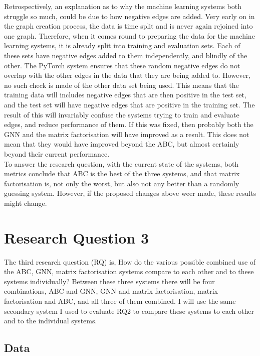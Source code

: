 \documentclass{l4proj}
\begin{document}
Retrospectively, an explanation as to why the machine learning systems both struggle so much, could be due to how negative edges are added. Very early on in the graph creation process, the data is time split and is never again rejoined into one graph. Therefore, when it comes round to preparing the data for the machine learning systems, it is already split into training and evaluation sets. Each of these sets have negative edges added to them independently, and blindly of the other. The PyTorch system ensures that these random negative edges do not overlap with the other edges in the data that they are being added to. However, no such check is made of the other data set being used. This means that the training data will includes negative edges that are then positive in the test set, and the test set will have negative edges that are positive in the training set. The result of this will invariably confuse the systems trying to train and evaluate edges, and reduce performance of them. If this was fixed, then probably both the GNN and the matrix factorisation will have improved as a result. This does not mean that they would have improved beyond the ABC, but almost certainly beyond their current performance. \\

To answer the research  question, with the current state of the systems, both metrics conclude that ABC is the best of the three systems, and that matrix factorisation is, not only the worst, but also not any better than a randomly guessing system. However, if the proposed changes above weer made, these results might change.\\

\section{Research Question 3}

The third research question (RQ) is, How do the various possible combined use of the ABC, GNN, matrix factorisation systems compare to each other and to these systems individually? Between these three systems there will be four combinations, ABC and GNN, GNN and matrix factorisation, matrix factorisation and ABC, and all three of them combined. I will use the same secondary system I used to evaluate RQ2 to compare these systems to each other and to the individual systems. \\

\subsection{Data}
\end{document}
